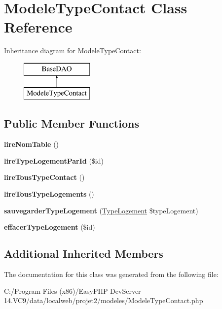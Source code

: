 \hypertarget{class_modele_type_contact}{}\section{Modele\+Type\+Contact Class Reference}
\label{class_modele_type_contact}
Inheritance diagram for Modele\+Type\+Contact\+:\begin{figure}[H]
\begin{center}
\leavevmode
\includegraphics[height=2.000000cm]{class_modele_type_contact}
\end{center}
\end{figure}
\subsection*{Public Member Functions}
\begin{DoxyCompactItemize}
\item 
\mbox{\label{class_modele_type_contact_a2031893c204cc2b8155ac8cf8de7a492}} 
{\bfseries lire\+Nom\+Table} ()
\item 
\mbox{\label{class_modele_type_contact_a9f6803a09803500d4e92f4787bb5d97b}} 
{\bfseries lire\+Type\+Logement\+Par\+Id} (\$id)
\item 
\mbox{\label{class_modele_type_contact_a0354a2d0c95f809e0931038736bd8ae2}} 
{\bfseries lire\+Tous\+Type\+Contact} ()
\item 
\mbox{\label{class_modele_type_contact_adb3fd6e2a316ca9bf45819b39225cc10}} 
{\bfseries lire\+Tous\+Type\+Logements} ()
\item 
\mbox{\label{class_modele_type_contact_a3cd0feaa77a825c5c65332d2e5ca4aa0}} 
{\bfseries sauvegarder\+Type\+Logement} (\hyperlink{class_type_logement}{Type\+Logement} \$type\+Logement)
\item 
\mbox{\label{class_modele_type_contact_ae3a76327c6929b924b43e6ef039609f2}} 
{\bfseries effacer\+Type\+Logement} (\$id)
\end{DoxyCompactItemize}
\subsection*{Additional Inherited Members}


The documentation for this class was generated from the following file\+:\begin{DoxyCompactItemize}
\item 
C\+:/\+Program Files (x86)/\+Easy\+P\+H\+P-\/\+Dev\+Server-\/14.\+V\+C9/data/localweb/projet2/modeles/Modele\+Type\+Contact.\+php\end{DoxyCompactItemize}
